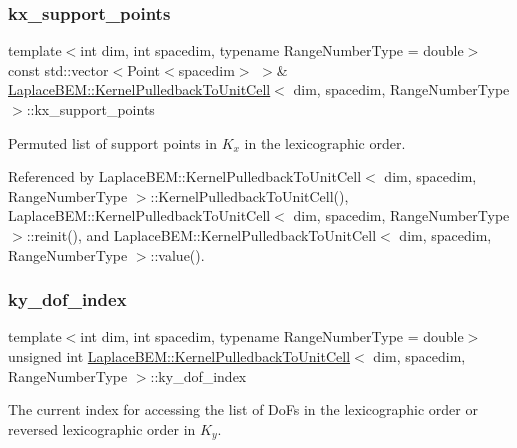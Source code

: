 \subsubsection{\texorpdfstring{kx\+\_\+support\+\_\+points}{kx\_support\_points}}
{\footnotesize\ttfamily template$<$int dim, int spacedim, typename Range\+Number\+Type = double$>$ \\
const std\+::vector$<$Point$<$spacedim$>$ $>$\& \hyperlink{classLaplaceBEM_1_1KernelPulledbackToUnitCell}{Laplace\+B\+E\+M\+::\+Kernel\+Pulledback\+To\+Unit\+Cell}$<$ dim, spacedim, Range\+Number\+Type $>$\+::kx\+\_\+support\+\_\+points\hspace{0.3cm}{\ttfamily [private]}}

Permuted list of support points in $K_x$ in the lexicographic order. 

Referenced by Laplace\+B\+E\+M\+::\+Kernel\+Pulledback\+To\+Unit\+Cell$<$ dim, spacedim, Range\+Number\+Type $>$\+::\+Kernel\+Pulledback\+To\+Unit\+Cell(), Laplace\+B\+E\+M\+::\+Kernel\+Pulledback\+To\+Unit\+Cell$<$ dim, spacedim, Range\+Number\+Type $>$\+::reinit(), and Laplace\+B\+E\+M\+::\+Kernel\+Pulledback\+To\+Unit\+Cell$<$ dim, spacedim, Range\+Number\+Type $>$\+::value().

\mbox{\label{classLaplaceBEM_1_1KernelPulledbackToUnitCell_ae6f3e4bc6cf09546bf11d01812f9b692}} 
\subsubsection{\texorpdfstring{ky\+\_\+dof\+\_\+index}{ky\_dof\_index}}
{\footnotesize\ttfamily template$<$int dim, int spacedim, typename Range\+Number\+Type = double$>$ \\
unsigned int \hyperlink{classLaplaceBEM_1_1KernelPulledbackToUnitCell}{Laplace\+B\+E\+M\+::\+Kernel\+Pulledback\+To\+Unit\+Cell}$<$ dim, spacedim, Range\+Number\+Type $>$\+::ky\+\_\+dof\+\_\+index\hspace{0.3cm}{\ttfamily [private]}}

The current index for accessing the list of Do\+Fs in the lexicographic order or reversed lexicographic order in $K_y$. 

